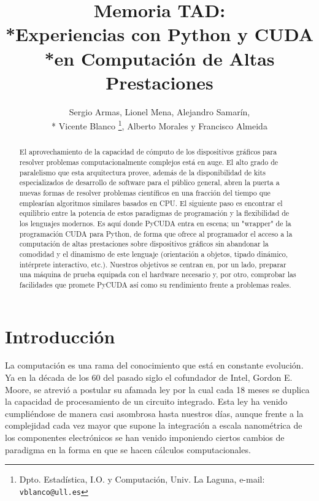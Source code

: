 \documentclass[twoside]{article}
\begin{document}

\title{Memoria TAD:\\*Experiencias con Python y CUDA\\*en Computación de Altas Prestaciones}

\author{Sergio Armas, %
     Lionel Mena, %
     Alejandro Samarín,\\*%
     Vicente Blanco%
     \thanks{Dpto. Estadística, I.O. y Computación, Univ. La Laguna, e-mail: {\tt vblanco@ull.es}}, %
     Alberto Morales y %
     Francisco Almeida
}

\maketitle
\markboth{}{}
\pagestyle{empty} 
\thispagestyle{empty} %

\begin{abstract}
El aprovechamiento de la capacidad de cómputo de los dispositivos gráficos para resolver problemas computacionalmente complejos está en auge. El alto grado de paralelismo que esta arquitectura provee, además de la disponibilidad de kits especializados de desarrollo de software para el público general, abren la puerta a nuevas formas de resolver problemas científicos en una fracción del tiempo que emplearían algoritmos similares basados en CPU. El siguiente paso es encontrar el equilibrio entre la potencia de estos paradigmas de programación y la flexibilidad de los lenguajes modernos. Es aquí donde PyCUDA entra en escena; un "wrapper" de la programación CUDA para Python, de forma que ofrece al programador el acceso a la computación de altas prestaciones sobre dispositivos gráficos sin abandonar la comodidad y el dinamismo de este lenguaje (orientación a objetos, tipado dinámico, intérprete interactivo, etc.). Nuestros objetivos se centran en, por un lado, preparar una máquina de prueba equipada con el hardware necesario y, por otro, comprobar las facilidades que promete PyCUDA así como su rendimiento frente a problemas reales.
\end{abstract}


\section{Introducción}
La computación es una rama del conocimiento que está en constante evolución. Ya en la década de los 60 del pasado siglo el cofundador de Intel, Gordon E. Moore, se atrevió a postular su afamada ley por la cual cada 18 meses se duplica la capacidad de procesamiento de un circuito integrado. Esta ley ha venido cumpliéndose de manera casi asombrosa hasta nuestros días, aunque frente a la complejidad cada vez mayor que supone la integración a escala nanométrica de los componentes electrónicos se han venido imponiendo ciertos cambios de paradigma en la forma en que se hacen cálculos computacionales.
\end{document}
